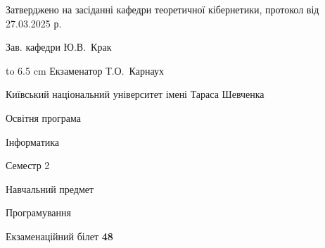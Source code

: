 \documentclass[12pt, ukrainian]{article}
\begin{document}
{\smallskip\smallskip \begin {scriptsize} Затверджено на засіданні кафедри теоретичної кібернетики, протокол   від   27.03.2025 р.\par\smallskip\smallskip\smallskip\smallskip
{\parbox {6.5 cm} {Зав. кафедри \dotfill Ю.В.~Крак}}\hspace {0.7cm} {\hbox to 6.5 cm { Екзаменатор \dotfill Т.О.~Карнаух}} \end{scriptsize}}
\newpage
{{\begin {scriptsize}\par
{ \center  Київський національний університет імені Тараса Шевченка \par}
{\parbox {5 cm}{Освітня програма \hfill}{\parbox {7 cm}{Інформатика\hfill}}\parbox {6 cm}{\hfill Семестр 2}}\par
{\parbox {5 cm} {Навчальний предмет \hfill}\parbox {7 cm}{Програмування \hfill}\parbox {6cm}{\hfill}\par}\vspace{-15pt} \end{scriptsize}}{\center Екзаменаційний білет \No \textbf { 48 }\par}}
\end{document}
